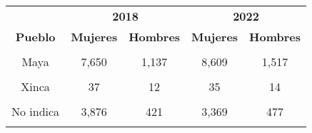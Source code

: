 \begin{tabular}[t]{ccccc}
\toprule
\multicolumn{1}{c}{\textbf{ }} & \multicolumn{2}{c}{\textbf{2018}} & \multicolumn{2}{c}{\textbf{2022}} \\
\cmidrule(l{3pt}r{3pt}){2-3} \cmidrule(l{3pt}r{3pt}){4-5}
\textbf{Pueblo} & \textbf{Mujeres} & \textbf{Hombres} & \textbf{Mujeres} & \textbf{Hombres}\\
\midrule
\cellcolor[HTML]{B6B3FF}{Ladinos} & \cellcolor[HTML]{B6B3FF}{14,320} & \cellcolor[HTML]{B6B3FF}{2,118} & \cellcolor[HTML]{B6B3FF}{19,133} & \cellcolor[HTML]{B6B3FF}{3,315}\\
Maya & 7,650 & 1,137 & 8,609 & 1,517\\
\cellcolor[HTML]{B6B3FF}{Garífuna} & \cellcolor[HTML]{B6B3FF}{46} & \cellcolor[HTML]{B6B3FF}{11} & \cellcolor[HTML]{B6B3FF}{40} & \cellcolor[HTML]{B6B3FF}{6}\\
Xinca & 37 & 12 & 35 & 14\\
\cellcolor[HTML]{B6B3FF}{Otro} & \cellcolor[HTML]{B6B3FF}{91} & \cellcolor[HTML]{B6B3FF}{10} & \cellcolor[HTML]{B6B3FF}{152} & \cellcolor[HTML]{B6B3FF}{25}\\
No indica & 3,876 & 421 & 3,369 & 477\\
\cellcolor[HTML]{B6B3FF}{Ignorado} & \cellcolor[HTML]{B6B3FF}{234} & \cellcolor[HTML]{B6B3FF}{29} & \cellcolor[HTML]{B6B3FF}{400} & \cellcolor[HTML]{B6B3FF}{102}\\
\bottomrule
\end{tabular}
